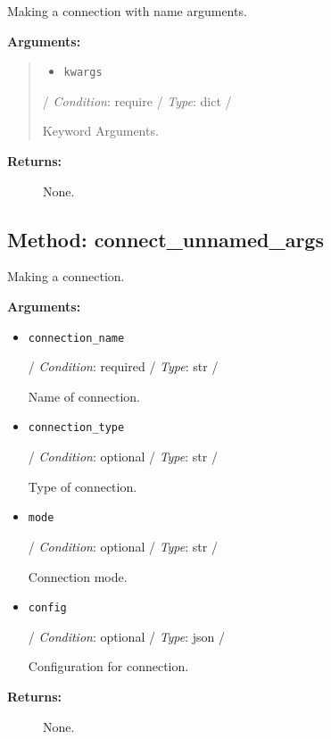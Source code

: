 Making a connection with name arguments.

\textbf{Arguments:}

\begin{quote}
\begin{itemize}
\tightlist
\item
  \texttt{kwargs}
\end{itemize}

/ \emph{Condition}: require / \emph{Type}: dict /

Keyword Arguments.
\end{quote}

\begin{description}
\item[\textbf{Returns:}]
None.
\end{description}

\hypertarget{qconnectbase-connection-manager-method-connect_unnamed_args-33}{%
\subsection{Method:
connect\_unnamed\_args}\label{qconnectbase-connection-manager-method-connect_unnamed_args-33}}

Making a connection.

\textbf{Arguments:}

\begin{itemize}
\item
  \texttt{connection\_name}

  / \emph{Condition}: required / \emph{Type}: str /

  Name of connection.
\item
  \texttt{connection\_type}

  / \emph{Condition}: optional / \emph{Type}: str /

  Type of connection.
\item
  \texttt{mode}

  / \emph{Condition}: optional / \emph{Type}: str /

  Connection mode.
\item
  \texttt{config}

  / \emph{Condition}: optional / \emph{Type}: json /

  Configuration for connection.
\end{itemize}

\begin{description}
\item[\textbf{Returns:}]
None.
\end{description}

